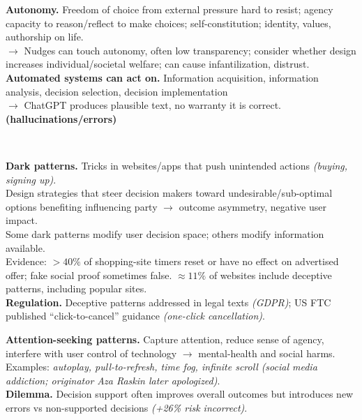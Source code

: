 \documentclass[8pt, a4paper]{extarticle}
\begin{document}
\begin{minipage}[t]{0.48\textwidth}
{\begin{minipage}[htp]{1\textwidth}
\begin{minipage}[t]{0.55\textwidth}
			\end{minipage}\hfill
			\begin{minipage}[t]{0.44\textwidth}
				\textbf{Autonomy.} Freedom of choice from external pressure hard to resist; agency capacity to reason/reflect to make choices; self-constitution; identity, values, authorship on life.\\
				$\rightarrow$ Nudges can touch autonomy, often low transparency; consider whether design increases individual/societal welfare; can cause infantilization, distrust.\\
				\textbf{Automated systems can act on.} Information acquisition, information analysis, decision selection, decision implementation\\
				$\rightarrow$ ChatGPT produces plausible text, no warranty it is correct. \textbf{(hallucinations/errors)}\\
			\end{minipage}\\
			\begin{minipage}[t]{0.49\textwidth}
				\textbf{Dark patterns.} Tricks in websites/apps that push unintended actions \textit{(buying, signing up)}.\\
				Design strategies that steer decision makers toward undesirable/sub-optimal options benefiting influencing party $\rightarrow$ outcome asymmetry, negative user impact.\\
				Some dark patterns modify user decision space; others modify information available.\\
				Evidence: $>40\%$ of shopping-site timers reset or have no effect on advertised offer; fake social proof sometimes false. $\approx 11\%$ of websites include deceptive patterns, including popular sites.\\
				\textbf{Regulation.} Deceptive patterns addressed in legal texts \textit{(GDPR)}; US FTC published ``click-to-cancel'' guidance \textit{(one-click cancellation)}.
			\end{minipage}\hfill
			\begin{minipage}[t]{0.49\textwidth}
				\textbf{Attention-seeking patterns.} Capture attention, reduce sense of agency, interfere with user control of technology $\rightarrow$ mental-health and social harms.\\
				Examples: \textit{autoplay, pull-to-refresh, time fog, infinite scroll} \textit{(social media addiction; originator Aza Raskin later apologized)}.\\
				\textbf{Dilemma.} Decision support often improves overall outcomes but introduces new errors vs non-supported decisions \textit{(+26\% risk incorrect)}.\\

\end{minipage}
\end{minipage}}
\end{minipage}
\end{document}
